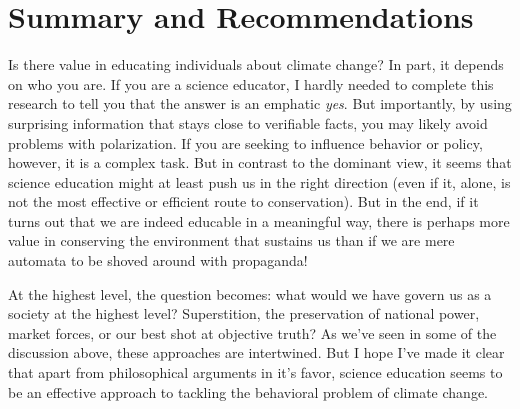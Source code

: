 
\section{Summary and Recommendations}

Is there value in educating individuals about climate change? In part, it
depends on who you are. If you are a science educator, I hardly needed to
complete this research to tell you that the answer is an emphatic \emph{yes}.
But importantly, by using surprising information that stays close to verifiable
facts, you may likely avoid problems with polarization. If you are seeking to
influence behavior or policy, however, it is a complex task.  But in contrast to
the dominant view, it seems that science education might at least push us in the
right direction (even if it, alone, is not the most effective or efficient route
to conservation). But in the end, if it turns out that we are indeed educable in
a meaningful way, there is perhaps more value in conserving the environment that
sustains us than if we are mere automata to be shoved around with propaganda!

At the highest level, the question becomes: what would we have govern us as a
society at the highest level? Superstition, the preservation of national power,
market forces, or our best shot at objective truth? As we've seen in some of the
discussion above, these approaches are intertwined. But I hope I've made it
clear that apart from philosophical arguments in it's favor, science education
seems to be an effective approach to tackling the behavioral problem of climate
change.
